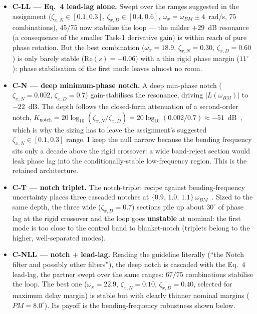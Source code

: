 \documentclass[../main.tex]{subfiles}
\begin{document}
\begin{itemize}
\item \textbf{C-LL --- Eq.~4 lead-lag alone.} Swept over the ranges suggested in
the assignment ($\zeta_{x,N} \in [0.1,0.3]$, $\zeta_{x,D} \in [0.4,0.6]$,
$\omega_x = \omega_{BM} \pm 4$~rad/s, $75$ combinations), $45/75$ now stabilise
the loop --- the milder $+29$~dB resonance (a consequence of the smaller Task-1
derivative gain) is within reach of pure phase rotation. But the best
combination ($\omega_x = 18.9$, $\zeta_{x,N}=0.30$, $\zeta_{x,D}=0.60$) is only
barely stable ($\mathrm{Re}(s) = -0.06$) with a thin rigid phase margin
($11^\circ$): phase stabilisation of the first mode leaves almost no room.
\item \textbf{C-N --- deep minimum-phase notch.} A deep min-phase notch
($\zeta_{x,N}=0.002$, $\zeta_{x,D}=0.7$) gain-stabilises the resonance, driving
$|L(\omega_{BM})|$ to $-22$~dB. The depth follows the closed-form attenuation of a
second-order notch, $K_\mathrm{notch}=20\log_{10}(\zeta_{x,N}/\zeta_{x,D})
=20\log_{10}(0.002/0.7)\approx-51$~dB~\cite[Lecture~18]{dclvnotes}, which is why
the sizing has to leave the assignment's suggested $\zeta_{x,N}\in[0.1,0.3]$
range. I keep the null narrow because the bending frequency sits only a decade
above the rigid crossover: a wide band-reject section would leak phase lag into
the conditionally-stable low-frequency region. This is the retained architecture.
\item \textbf{C-T --- notch triplet.} The notch-triplet recipe against
bending-frequency uncertainty places three cascaded notches at
$\{0.9,\,1.0,\,1.1\}\,\omega_{BM}$~\cite[Lecture~18]{dclvnotes}. Sized to the
same depth, the three wide ($\zeta_{x,D}=0.7$) sections pile up about $30^\circ$
of phase lag at the rigid crossover and the loop goes \textbf{unstable} at
nominal: the first mode is too close to the control band to blanket-notch
(triplets belong to the higher, well-separated modes).
\item \textbf{C-NLL --- notch $+$ lead-lag.} Reading the guideline literally
(``the Notch filter and possibly other filters''), the deep notch is cascaded
with the Eq.~4 lead-lag, the partner swept over the same ranges: $67/75$
combinations stabilise the loop. The best one ($\omega_x = 22.9$,
$\zeta_{x,N}=0.10$, $\zeta_{x,D}=0.40$, selected for maximum delay margin) is
stable but with clearly thinner nominal margins ($PM = 8.0^\circ$). Its payoff
is the bending-frequency robustness shown below.
\end{itemize}
\end{document}
